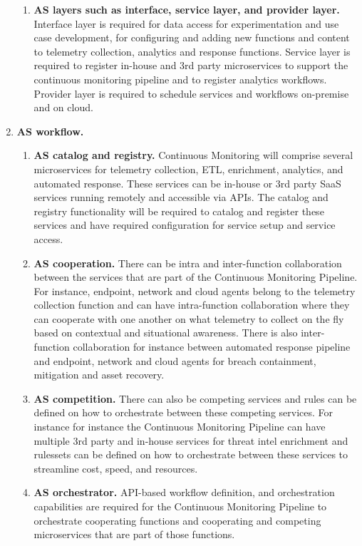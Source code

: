 \begin{enumerate}
\begin{enumerate}
  \item{\bf AS layers such as interface, service layer, and provider layer.} Interface layer is required for data access for experimentation and use case development, for configuring and adding new functions and content to telemetry collection, analytics and response functions. Service layer is required to register in-house and 3rd party microservices to support the continuous monitoring pipeline and to register analytics workflows. Provider layer is required to schedule services and workflows on-premise and on cloud.
  \end{enumerate}

\item{\bf AS workflow.}

  \begin{enumerate}
  
  \item{\bf AS catalog and registry.} Continuous Monitoring will comprise several microservices for telemetry collection, ETL, enrichment, analytics, and automated response. These services can be in-house or 3rd party SaaS services running remotely and accessible via APIs. The catalog and registry functionality will be required to catalog and register these services and have required configuration for service setup and service access.
  
  \item{\bf AS cooperation.} There can be intra and inter-function collaboration between the services that are part of the Continuous Monitoring Pipeline. For instance, endpoint, network and cloud agents belong to the telemetry collection function and can have intra-function collaboration where they can cooperate with one another on what telemetry to collect on the fly based on contextual and situational awareness. There is also inter-function collaboration for instance between automated response pipeline and endpoint, network and cloud agents for breach containment, mitigation and asset recovery.
  
  \item{\bf AS competition.} There can also be competing services and rules can be defined on how to orchestrate between these competing services. For instance for instance the Continuous Monitoring Pipeline can have multiple 3rd party and in-house services for threat intel enrichment and rulessets can be defined on how to orchestrate between these services to streamline cost, speed, and resources.
  
  \item{\bf AS orchestrator.} API-based workflow definition, and orchestration capabilities are required for the Continuous Monitoring Pipeline to orchestrate cooperating functions and cooperating and competing microservices that are part of those functions.
  

\end{enumerate}
\end{enumerate}

